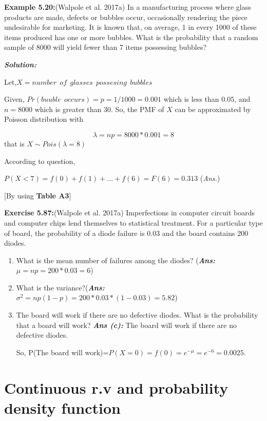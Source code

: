 \documentclass[
  11pt,
  letterpaper,
  DIV=11,
  numbers=noendperiod]{scrreprt}
\begin{document}
\textbf{Example 5.20:}(Walpole et al. 2017a) In a manufacturing process
where glass products are made, defects or bubbles occur, occasionally
rendering the piece undesirable for marketing. It is known that, on
average, 1 in every 1000 of these items produced has one or more
bubbles. What is the probability that a random sample of 8000 will yield
fewer than 7 items possessing bubbles?

\textbf{\emph{Solution:}}

Let,\(X=number\ \ of \ \ glasses\ \ possesing\ \ bubbles\)

Given, \(Pr(buuble \ \ occurs)=p=1/1000=0.001\) which is less than
\(0.05\), and \(n=8000\) which is greater than \(30\). So, the PMF of
\(X\) can be approximated by Poisson distribution with

\[\lambda =np=8000*0.001=8\] that is \(X\sim Pois (\lambda=8)\)

According to question,

\(P(X<7)=f(0)+f(1)+...+f(6)=F(6)=0.313\) (\emph{Ans.})

{[}By using \textbf{Table A3}{]}

\textbf{Exercise 5.87:}(Walpole et al. 2017a) Imperfections in computer
circuit boards and computer chips lend themselves to statistical
treatment. For a particular type of board, the probability of a diode
failure is 0.03 and the board contains 200 diodes.

\begin{enumerate}
\def\labelenumi{(\alph{enumi})}
\item
  What is the mean number of failures among the diodes?
  (\textbf{\emph{Ans:}} \(\mu=np=200*0.03=6\))
\item
  What is the variance?(\textbf{\emph{Ans:}}
  \(\sigma^2=np(1-p)=200*0.03*(1-0.03)=5.82\))
\item
  The board will work if there are no defective diodes. What is the
  probability that a board will work? \textbf{\emph{Ans (c):}} The board
  will work if there are no defective diodes.

  So, P(The board will work)=\(P(X=0)=f(0)=e^{-\mu}=e^{-6}=0.0025\).
\end{enumerate}


\chapter{Continuous r.v and probability density
function}\label{continuous-r.v-and-probability-density-function}
\end{document}
